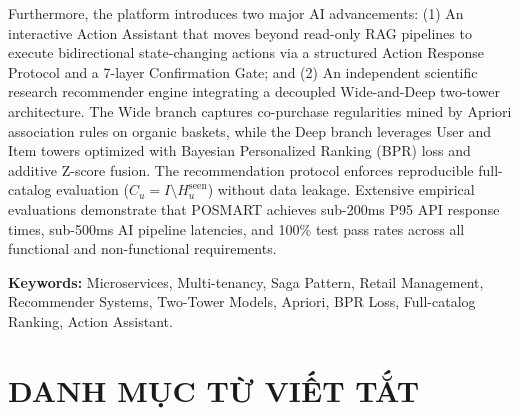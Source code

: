 \documentclass[12pt,a4paper]{report}
\begin{document}
Furthermore, the platform introduces two major AI advancements: (1) An interactive Action Assistant that moves beyond read-only RAG pipelines to execute bidirectional state-changing actions via a structured Action Response Protocol and a 7-layer Confirmation Gate; and (2) An independent scientific research recommender engine integrating a decoupled Wide-and-Deep two-tower architecture. The Wide branch captures co-purchase regularities mined by Apriori association rules on organic baskets, while the Deep branch leverages User and Item towers optimized with Bayesian Personalized Ranking (BPR) loss and additive Z-score fusion. The recommendation protocol enforces reproducible full-catalog evaluation ($C_u = I \setminus H_u^{\text{seen}}$) without data leakage. Extensive empirical evaluations demonstrate that POSMART achieves sub-200ms P95 API response times, sub-500ms AI pipeline latencies, and 100\% test pass rates across all functional and non-functional requirements.

\vspace{0.4cm}
\noindent\textbf{Keywords:} Microservices, Multi-tenancy, Saga Pattern, Retail Management, Recommender Systems, Two-Tower Models, Apriori, BPR Loss, Full-catalog Ranking, Action Assistant.

\newpage
\tableofcontents
\newpage
\listoffigures
\newpage
\listoftables
\newpage

\chapter*{DANH MỤC TỪ VIẾT TẮT}
\end{document}
